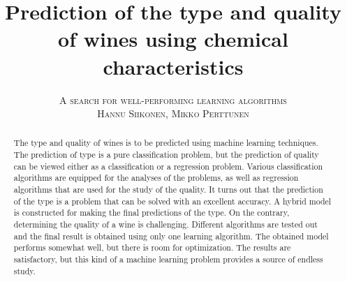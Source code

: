 \documentclass[twoside]{article}
\title{\vspace{-15mm}\fontsize{24pt}{10pt}\selectfont\textbf{Prediction of the type and quality of wines using chemical characteristics}}
\author{
\large
\textsc{A search for well-performing learning algorithms}\\[2mm]
\textsc{Hannu Siikonen, Mikko Perttunen}\\[2mm]
\vspace{-5mm}
}
\date{}
\begin{document}
\maketitle %


\begin{abstract}
The type and quality of wines is to be predicted using machine learning techniques. The prediction
of type is a pure classification problem, but the prediction of quality can be viewed either as
a classification or a regression problem. Various classification algorithms are equipped
for the analyses of the problems, as well as regression algorithms that are used for the study
of the quality. It turns out that the prediction of the type is a problem that can be solved
with an excellent accuracy. A hybrid model is constructed for making the final predictions
of the type. On the contrary, determining the quality of a wine is challenging. Different
algorithms are tested out and the final result is obtained using only one learning
algorithm. The obtained model performs somewhat well, but there is room for optimization. 
The results are satisfactory, but this kind of a machine learning problem provides a source
of endless study.

\end{abstract}

\end{document}
